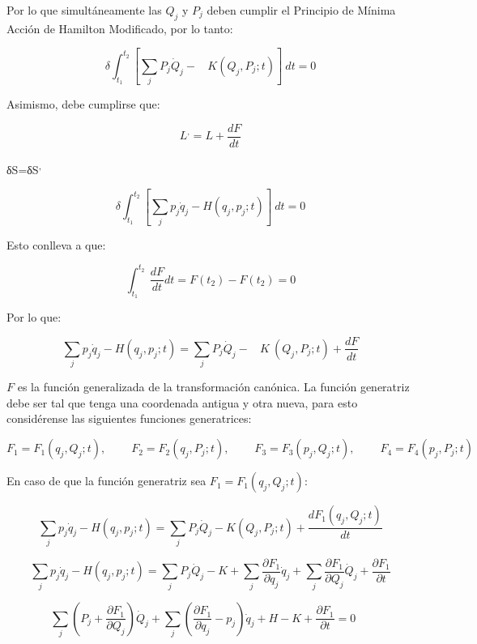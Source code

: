 \documentclass[]{article}
\begin{document}
Por lo que simultáneamente las \(Q_{j}\) y \(P_{j}\) deben cumplir el
Principio de Mínima Acción de Hamilton Modificado, por lo tanto:

\[\delta\int_{t_{1}}^{t_{2}}{\left\lbrack \sum_{j}^{}{P_{j}{\dot{Q}}_{j} - \ \ \ \ K\left( Q_{j},P_{j};t \right)} \right\rbrack\ dt} = 0\]

Asimismo, debe cumplirse que:

\[L^{,} = L + \frac{dF}{dt}\]

δS=δS\textsuperscript{,}

\[\delta\int_{t_{1}}^{t_{2}}{\left\lbrack \sum_{j}^{}{p_{j}{\dot{q}}_{j} - H\left( q_{j},p_{j};t \right)} \right\rbrack\ dt} = 0\]

Esto conlleva a que:

\[\int_{t_{1}}^{t_{2}}{\ \frac{dF}{dt}}dt = F\left( t_{2} \right) - F\left( t_{2} \right) = 0\]

Por lo que:

\[\sum_{j}^{}{p_{j}{\dot{q}}_{j} - H\left( q_{j},p_{j};t \right)} = \sum_{j}^{}{P_{j}{\dot{Q}}_{j} - \ \ \ \ K\ \left( Q_{j},P_{j};t \right)} + \frac{dF}{dt}\]

\(F\) es la función generalizada de la transformación canónica. La
función generatriz debe ser tal que tenga una coordenada antigua y otra
nueva, para esto considérense las siguientes funciones generatrices:

\[F_{1} = F_{1}\left( q_{j},Q_{j};t \right),\ \ \ \ \ \ \ \ \ \ F_{2} = F_{2}\left( q_{j},P_{j};t \right),\ \ \ \ \ \ \ \ \ \ F_{3} = F_{3}\left( p_{j},Q_{j};t \right),\ \ \ \ \ \ \ \ \ \ F_{4} = F_{4}\left( p_{j},P_{j};t \right)\]

En caso de que la función generatriz sea
\(F_{1} = F_{1}\left( q_{j},Q_{j};t \right)\):

\[\sum_{j}^{}{p_{j}{\dot{q}}_{j} - H\left( q_{j},p_{j};t \right)} = \sum_{j}^{}{P_{j}{\dot{Q}}_{j} - K\left( Q_{j},P_{j};t \right)} + \frac{dF_{1}\left( q_{j},Q_{j};t \right)}{dt}\]

\[\sum_{j}^{}{p_{j}{\dot{q}}_{j} - H\left( q_{j},p_{j};t \right)} = \sum_{j}^{}{P_{j}{\dot{Q}}_{j} - K} + \sum_{j}^{}{\frac{\partial F_{1}}{\partial q_{j}}{\dot{q}}_{j}} + \sum_{j}^{}{\frac{\partial F_{1}}{\partial Q_{j}}{\dot{Q}}_{j}} + \frac{\partial F_{1}}{\partial t}\]

\[\sum_{j}^{}\left( P_{j} + \frac{\partial F_{1}}{\partial Q_{j}} \right){\dot{Q}}_{j} + \sum_{j}^{}\left( \frac{\partial F_{1}}{\partial q_{j}} - p_{j} \right){\dot{q}}_{j} + H - K + \frac{\partial F_{1}}{\partial t} = 0\ \ \ \ \ \ \]
\end{document}
